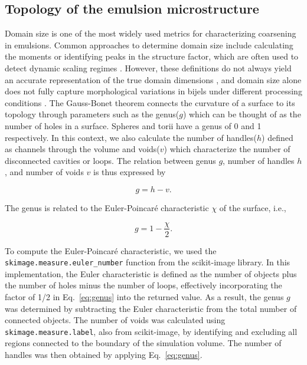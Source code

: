 \subsection{Topology of the emulsion microstructure}

Domain size is one of the most widely used metrics for characterizing coarsening in emulsions. Common approaches to determine domain size include calculating the moments or identifying peaks in the structure 
factor, which are often used to detect dynamic scaling regimes \cite{kendon_inertial_2001}. However, these definitions do not always yield an accurate representation of the true domain dimensions 
\cite{karthikeyan_formation_2024}, and domain size alone does not fully capture morphological variations in bijels under different processing conditions \cite{reeves_quantitative_2016}. The Gauss-Bonet
theorem connects the curvature of a surface to its topology through parameters such as the genus($g$) which can be thought of as the number of holes in a surface. Spheres and torii have a genus of 0 and 1 respectively. 
In this context, we also calculate the number of handles($h$) defined as channels through the volume and voids($v$) which characterize the number of disconnected cavities or loops. The relation between genus \(g\), 
number of handles \(h\), and number of voids \(v\) is thus expressed by \cite{chan_channel_2012}

\begin{equation}
g = h - v .
\end{equation} 

The genus is related to the Euler-Poincar\'e characteristic \(\chi\) of the surface, i.e., 

\begin{equation}\label{eq:genus}
g = 1 - \frac{\chi}{2} .
\end{equation} 

To compute the Euler-Poincaré characteristic, we used the \texttt{skimage.measure.euler\_number} function from the scikit-image library. In this implementation, the Euler characteristic is defined as the 
number of objects plus the number of holes minus the number of loops, effectively incorporating the factor of 1/2 in Eq.~\ref{eq:genus} into the returned value. As a result, the genus \(g\) was determined 
by subtracting the Euler characteristic from the total number of connected objects. The number of voids was calculated using \texttt{skimage.measure.label}, also from scikit-image, by identifying and 
excluding all regions connected to the boundary of the simulation volume. The number of handles was then obtained by applying Eq.~\ref{eq:genus}.

